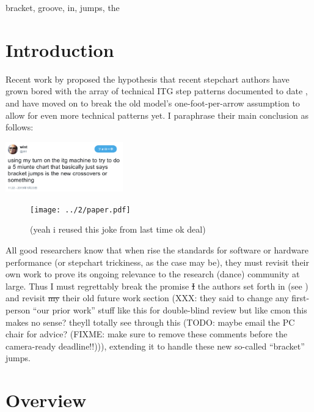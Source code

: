 \documentclass[10pt]{sigplanconf}
\begin{document}

\keywords
bracket, groove, in, jumps, the


\section{Introduction}

Recent work by \cite{dril}
proposed the hypothesis that
recent stepchart authors have grown bored with the array of technical ITG step patterns
documented to date \cite{turniness,crossoveriness},
and have moved on to break the old model's one-foot-per-arrow assumption to allow for even more technical patterns yet.
I paraphrase their main conclusion as follows:

\begin{center}
	\includegraphics[width=0.38\textwidth]{using-my-turn.png}
\end{center}

\begin{figure}[t]
	\hspace{-2em}\texttt{[image: ../2/paper.pdf]}
	\caption{(yeah i reused this joke from last time ok deal)}
	\label{fig:you-stutid-fuckass}
\end{figure}

All good researchers know that when rise the standards for software or hardware performance
(or stepchart trickiness, as the case may be),
they must revisit their own work to prove its ongoing relevance to the research (dance) community at large.
Thus I must regrettably break the promise \sout{I} the authors set forth in \cite{crossoveriness}
(see )
and revisit \sout{my} their old future work section
(XXX: they said to change any first-person ``our prior work''
stuff like this for double-blind review but like cmon this makes no sense?
theyll totally see through this
(TODO: maybe email the PC chair for advice?
(FIXME: make sure to remove these comments before the camera-ready deadline!!))),
extending it to handle these new so-called ``bracket'' jumps.


\section{Overview}
\end{document}
